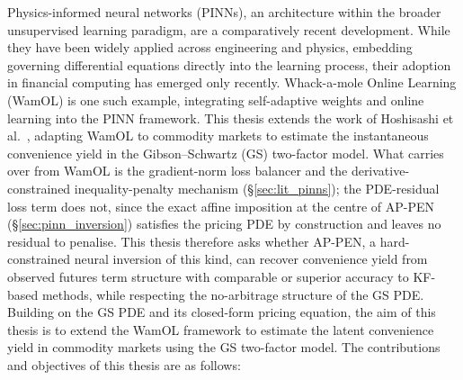 \documentclass[sigconf, authorversion=true, nonacm=true]{acmart}
\begin{document}
Physics-informed neural networks (PINNs), an architecture within the broader unsupervised learning paradigm, are a comparatively recent development. While they have been widely applied across engineering and physics, embedding governing differential equations directly into the learning process, their adoption in financial computing has emerged only recently. Whack-a-mole Online Learning (WamOL) is one such example, integrating self-adaptive weights and online learning into the PINN framework. This thesis extends the work of Hoshisashi et al.~\cite{Hoshisashi2024Whack-a-moleSurface}, adapting WamOL to commodity markets to estimate the instantaneous convenience yield in the Gibson--Schwartz (GS) two-factor model. What carries over from WamOL is the gradient-norm loss balancer and the derivative-constrained inequality-penalty mechanism (\S\ref{sec:lit_pinns}); the PDE-residual loss term does not, since the exact affine imposition at the centre of AP-PEN (\S\ref{sec:pinn_inversion}) satisfies the pricing PDE by construction and leaves no residual to penalise.
This thesis therefore asks whether AP-PEN, a hard-constrained neural inversion of this kind, can recover convenience yield from observed futures term structure with comparable or superior accuracy to KF-based methods, while respecting the no-arbitrage structure of the GS PDE. Building on the GS PDE and its closed-form pricing equation, the aim of this thesis is to extend the WamOL framework to estimate the latent convenience yield in commodity markets using the GS two-factor model. The contributions and objectives of this thesis are as follows:
\end{document}
